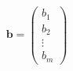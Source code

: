 \begin{equation*}
	\bm{b}=
	\begin{pmatrix}
		b_1 \\ b_2\\ \vdots \\ b_m
	\end{pmatrix}
\end{equation*}
